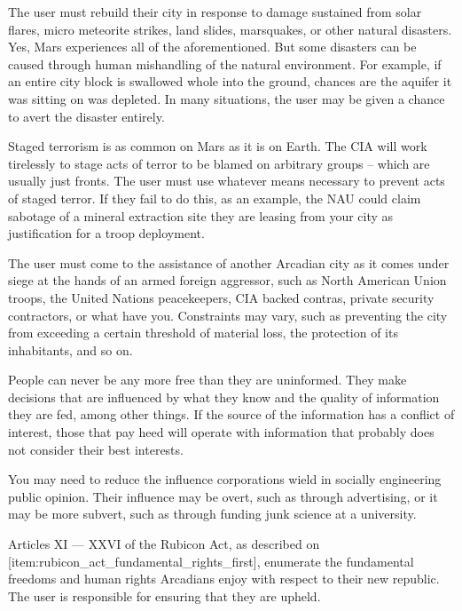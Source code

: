 
The user must rebuild their city in response to damage sustained from solar flares, micro meteorite strikes, land slides, marsquakes, or other natural disasters. Yes, Mars experiences all of the aforementioned. But some  disasters can be caused through human mishandling of the natural environment. For example, if an entire city block is swallowed whole into the ground, chances are the aquifer it was sitting on was depleted. In many situations, the user may be given a chance to avert the disaster entirely.


Staged terrorism is as common on Mars as it is on Earth. The CIA will work tirelessly to stage acts of terror to be blamed on arbitrary groups -- which are usually just fronts. The user must use whatever means necessary to prevent acts of staged terror. If they fail to do this, as an example, the NAU could claim sabotage of a mineral extraction site they are leasing from your city as justification for a troop deployment.


The user must come to the assistance of another Arcadian city as it comes under siege at the hands of an armed foreign aggressor, such as North American Union troops, the United Nations peacekeepers, CIA backed contras, private security contractors, or what have you. Constraints may vary, such as preventing the city from exceeding a certain threshold of material loss, the protection of its inhabitants, and so on.


People can never be any more free than they are uninformed. They make decisions that are influenced by what they know and the quality of information they are fed, among other things. If the source of the information has a conflict of interest, those that pay heed will operate with information that probably does not consider their best interests.

You may need to reduce the influence corporations wield in socially engineering public opinion. Their influence may be overt, such as through advertising, or it may be more subvert, such as through funding junk science at a university.


Articles XI --- XXVI of the Rubicon Act, as described on [item:rubicon_act_fundamental_rights_first], enumerate the fundamental freedoms and human rights Arcadians enjoy with respect to their new republic. The user is responsible for ensuring that they are upheld.

